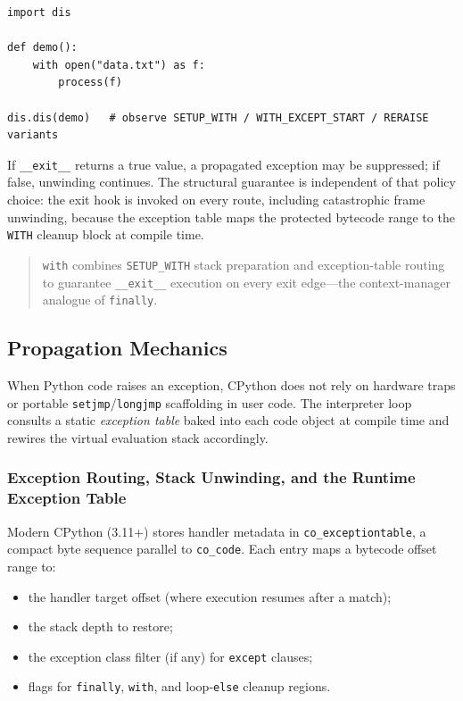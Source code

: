 \documentclass[a4paper,twoside]{report}
\begin{document}
\begin{verbatim}
import dis

def demo():
    with open("data.txt") as f:
        process(f)

dis.dis(demo)   # observe SETUP_WITH / WITH_EXCEPT_START / RERAISE variants
\end{verbatim}

If \texttt{\_\_exit\_\_} returns a true value, a propagated exception may be suppressed; if false, unwinding continues. The structural guarantee is independent of that policy choice: the exit hook is invoked on every route, including catastrophic frame unwinding, because the exception table maps the protected bytecode range to the \texttt{WITH} cleanup block at compile time.

\begin{quote}
\texttt{with} combines \texttt{SETUP\_WITH} stack preparation and exception-table routing to guarantee \texttt{\_\_exit\_\_} execution on every exit edge---the context-manager analogue of \texttt{finally}.
\end{quote}


\subsection{Propagation Mechanics}

When Python code raises an exception, CPython does not rely on hardware traps or portable \texttt{setjmp}/\texttt{longjmp} scaffolding in user code. The interpreter loop consults a static \emph{exception table} baked into each code object at compile time and rewires the virtual evaluation stack accordingly.

\subsubsection{Exception Routing, Stack Unwinding, and the Runtime Exception Table}

Modern CPython (3.11+) stores handler metadata in \texttt{co\_exceptiontable}, a compact byte sequence parallel to \texttt{co\_code}. Each entry maps a bytecode offset range to:

\begin{itemize}
    \item the handler target offset (where execution resumes after a match);
    \item the stack depth to restore;
    \item the exception class filter (if any) for \texttt{except} clauses;
    \item flags for \texttt{finally}, \texttt{with}, and loop-\texttt{else} cleanup regions.
\end{itemize}
\end{document}
